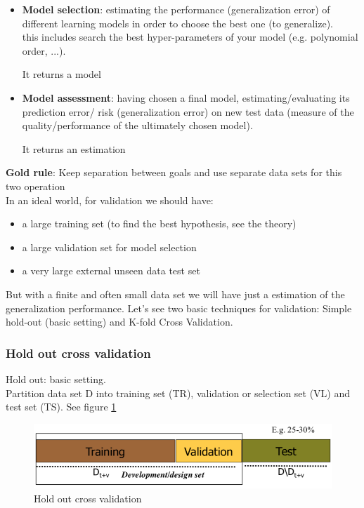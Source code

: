 \documentclass[../main.tex]{subfiles}
\begin{document}
\begin{itemize}
    \item \textbf{Model selection}: estimating the performance (generalization error) of different learning models in order to choose the best one (to generalize).\\
    this includes search the best hyper-parameters of your model (e.g. polynomial order, ...).
    \begin{center}
        It returns a model
    \end{center}
    
    \item \textbf{Model assessment}: having chosen a final model, estimating/evaluating its prediction error/ risk (generalization error) on new test data (measure of the quality/performance of the ultimately chosen model).
    \begin{center}
        It returns an estimation
    \end{center}
\end{itemize}

\noindent\textbf{Gold rule}: Keep separation between goals and use separate data sets for this two operation\\

In an ideal world, for validation we should have:

\begin{itemize}
    \item a large training set (to find the best hypothesis, see the theory)

    \item a large validation set for model selection
    
    \item a very large external unseen data test set
\end{itemize}
But with a finite and often small data set we will have just a estimation of the generalization performance. Let's see two basic techniques for validation: Simple hold-out (basic setting) and K-fold Cross Validation.

\subsubsection{Hold out cross validation}
Hold out: basic setting.\\ 
Partition data set D into training set (TR), validation or selection set (VL) and test set (TS). See figure \ref{fig:intro_cross_valid}
\begin{figure}[H]
    \centering
    \includegraphics[scale = 0.4]{lectures/1_Introduction/intro_cross_valid.png}
    \caption{Hold out cross validation}
    \label{fig:intro_cross_valid}
\end{figure}
\end{document}
